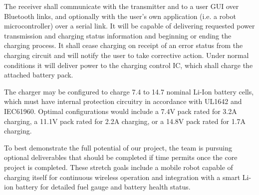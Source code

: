 \documentclass[12pt]{article}
\begin{document}
The receiver shall communicate with the transmitter and to a user GUI over Bluetooth links, and optionally with the user’s own application (i.e. a robot microcontroller) over a serial link. It will be capable of delivering requested power transmission and charging status information and beginning or ending the charging process. It shall cease charging on receipt of an error status from the charging circuit and will notify the user to take corrective action. Under normal conditions it will deliver power to the charging control IC, which shall charge the attached battery pack.\\ \indent

The charger may be configured to charge 7.4 to 14.7 nominal Li-Ion battery cells, which must have internal protection circuitry in accordance with UL1642 and IEC61960. Optimal configurations would include a 7.4V pack rated for 3.2A charging, a 11.1V pack rated for 2.2A charging, or a 14.8V pack rated for 1.7A charging.\\ \indent

To best demonstrate the full potential of our project, the team is pursuing optional deliverables that should be completed if time permits once the core project is completed. These stretch goals include a mobile robot capable of charging itself for continuous wireless operation and integration with a smart Li-ion battery for detailed fuel gauge and battery health status.

\pagebreak

\tableofcontents

\pagebreak

\listoffigures

\pagebreak

\listoftables

\pagebreak







\end{document}
